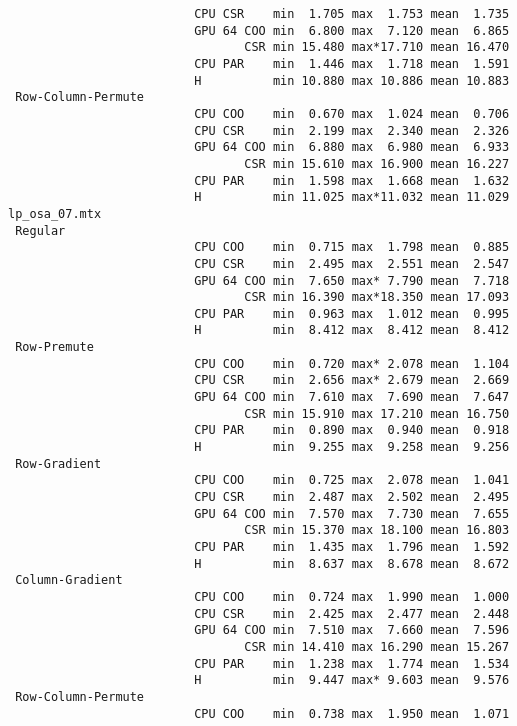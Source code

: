 {\begin{verbatim}
                          CPU CSR    min  1.705 max  1.753 mean  1.735
                          GPU 64 COO min  6.800 max  7.120 mean  6.865
                                 CSR min 15.480 max*17.710 mean 16.470
                          CPU PAR    min  1.446 max  1.718 mean  1.591
                          H          min 10.880 max 10.886 mean 10.883
 Row-Column-Permute
                          CPU COO    min  0.670 max  1.024 mean  0.706
                          CPU CSR    min  2.199 max  2.340 mean  2.326
                          GPU 64 COO min  6.880 max  6.980 mean  6.933
                                 CSR min 15.610 max 16.900 mean 16.227
                          CPU PAR    min  1.598 max  1.668 mean  1.632
                          H          min 11.025 max*11.032 mean 11.029
lp_osa_07.mtx
 Regular
                          CPU COO    min  0.715 max  1.798 mean  0.885
                          CPU CSR    min  2.495 max  2.551 mean  2.547
                          GPU 64 COO min  7.650 max* 7.790 mean  7.718
                                 CSR min 16.390 max*18.350 mean 17.093
                          CPU PAR    min  0.963 max  1.012 mean  0.995
                          H          min  8.412 max  8.412 mean  8.412
 Row-Premute
                          CPU COO    min  0.720 max* 2.078 mean  1.104
                          CPU CSR    min  2.656 max* 2.679 mean  2.669
                          GPU 64 COO min  7.610 max  7.690 mean  7.647
                                 CSR min 15.910 max 17.210 mean 16.750
                          CPU PAR    min  0.890 max  0.940 mean  0.918
                          H          min  9.255 max  9.258 mean  9.256
 Row-Gradient
                          CPU COO    min  0.725 max  2.078 mean  1.041
                          CPU CSR    min  2.487 max  2.502 mean  2.495
                          GPU 64 COO min  7.570 max  7.730 mean  7.655
                                 CSR min 15.370 max 18.100 mean 16.803
                          CPU PAR    min  1.435 max  1.796 mean  1.592
                          H          min  8.637 max  8.678 mean  8.672
 Column-Gradient
                          CPU COO    min  0.724 max  1.990 mean  1.000
                          CPU CSR    min  2.425 max  2.477 mean  2.448
                          GPU 64 COO min  7.510 max  7.660 mean  7.596
                                 CSR min 14.410 max 16.290 mean 15.267
                          CPU PAR    min  1.238 max  1.774 mean  1.534
                          H          min  9.447 max* 9.603 mean  9.576
 Row-Column-Permute
                          CPU COO    min  0.738 max  1.950 mean  1.071

\end{verbatim}}
